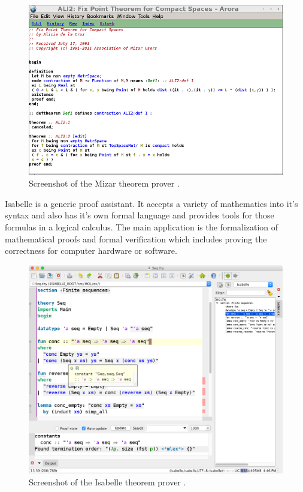 \begin{figure}[H]
\begin{center}
\includegraphics[scale=0.5]{Figures/Background/mizar.png}
\end{center}
\caption{Screenshot of the Mizar theorem prover \cite{mizar}. \label{fig:mizar}}
\end{figure}

Isabelle \cite{isabelle} is a generic proof assistant. It accepts a variety of
mathematics into it's syntax and also has it's own formal language and provides
tools for those formulas in a logical calculus. The main application is the
formalization of mathematical proofs and formal verification which includes
proving the correctness for computer hardware or software.

\begin{figure}[H]
\begin{center}
\includegraphics[scale=0.4]{Figures/Background/isabelle.png}
\end{center}
\caption{Screenshot of the Isabelle theorem prover \cite{isabelle}. \label{fig:isabelle}}
\end{figure}

